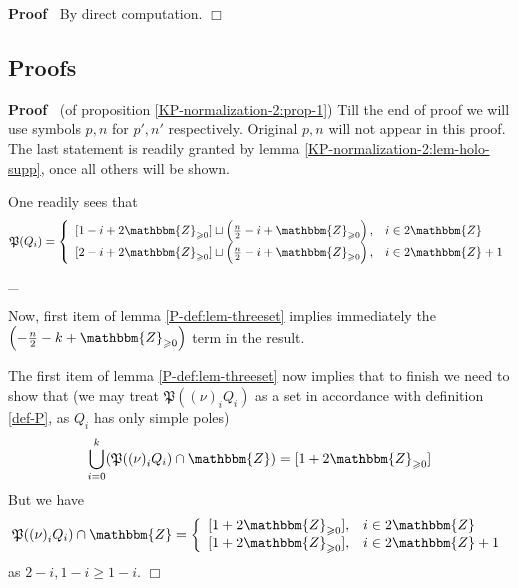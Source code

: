\documentclass{article}
\newenvironment{proof}{\noindent\textbf{Proof\ }}{\hspace*{\fill}$\Box$\medskip}
\numberwithin{definition}{section}
\numberwithin{lemma}{section}
\numberwithin{proposition}{section}
{\theorembodyfont{\rmfamily}\newtheorem{remark}{Remark}
\numberwithin{remark}{section}
}
\begin{document}
\begin{proof}
  By direct computation.
\end{proof}

\subsection{Proofs}

\begin{proof}
  (of proposition \ref{KP-normalization-2:prop-1}) Till the end of proof we
  will use symbols $p, n$ for $p', n'$ respectively. Original $p, n$ will not
  appear in this proof. The last statement is readily granted by lemma
  \ref{KP-normalization-2:lem-holo-supp}, once all others will be shown.
  
  One readily sees that
  \[ \mathfrak{P} ( Q_i) = \left\{ \begin{array}{ll}
       {}[ 1 - i + 2\mathbbm{Z}_{\geqslant 0}] \sqcup \left( \frac{n}{2} - i
       +\mathbbm{Z}_{\geqslant 0} \right), & i \in 2\mathbbm{Z}\\
       {}[ 2 - i + 2\mathbbm{Z}_{\geqslant 0}] \sqcup \left( \frac{n}{2} - i
       +\mathbbm{Z}_{\geqslant 0} \right), & i \in 2\mathbbm{Z}+ 1
     \end{array} \right. \]
  \_
  
  Now, first item of lemma \ref{P-def:lem-threeset} implies immediately the
  $\left( - \frac{n}{2} - k +\mathbbm{Z}_{\geqslant 0} \right)$ term in the
  result.
  
  The first item of lemma \ref{P-def:lem-threeset} now implies that to finish
  we need to show that (we may treat $\mathfrak{P} ( ( \nu)_i^{} Q_i)$ as a
  set in accordance with definition \ref{def-P}, as $Q_i$ has only simple
  poles)
  \[ \bigcup_{i = 0}^k ( \mathfrak{P} ( ( \nu)^{}_i Q_i) \cap \mathbbm{Z}) = [
     1 + 2\mathbbm{Z}_{\geqslant 0}] \]
  But we have
  \[ \mathfrak{P} ( ( \nu)^{}_i Q_i) \cap \mathbbm{Z}= \left\{
     \begin{array}{ll}
       {}[ 1 + 2\mathbbm{Z}_{\geqslant 0}], & i \in 2\mathbbm{Z}\\
       {}[ 1 + 2\mathbbm{Z}_{\geqslant 0}], & i \in 2\mathbbm{Z}+ 1
     \end{array} \right. \]
  as $2 - i, 1 - i \geqslant 1 - i$.
\end{proof}
\end{document}
